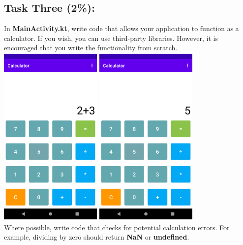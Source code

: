 \documentclass{article}
\begin{document}
\subsection*{Task Three (2\%):} 
In \textbf{MainActivity.kt}, write code that allows your application to function as a calculator. If you wish, you can use third-party libraries. However, it is encouraged that you write the functionality from scratch. \\

\includegraphics[width=5cm, height=9cm]{../../resources/img/practicals/02-calculator-3.png}
\includegraphics[width=5cm, height=9cm]{../../resources/img/practicals/02-calculator-4.png} \\

Where possible, write code that checks for potential calculation errors. For example, dividing by zero should return \textbf{NaN} or \textbf{undefined}. \\
\end{document}

